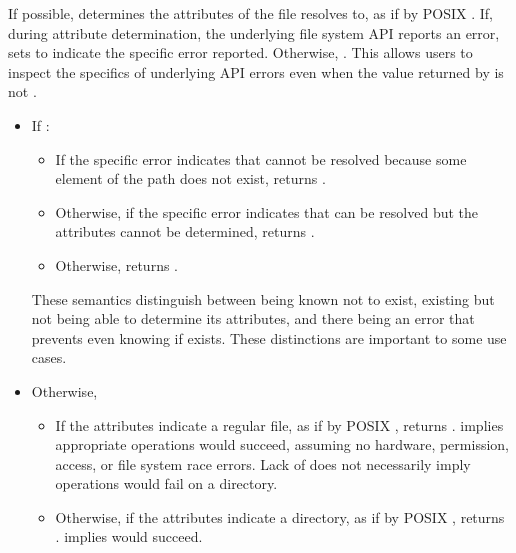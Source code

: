 \begin{itemdescr}
\pnum
\effects
If possible, determines the attributes
    of the file  resolves to, as if by POSIX .
      If, during attribute determination, the underlying file system API reports
    an error, sets  to indicate the specific error reported.
    Otherwise, .
\enternote This allows users to inspect the specifics of underlying
      API errors even when the value returned by  is not
      . \exitnote

\pnum
\returns
\begin{itemize}
\item
If :
\begin{itemize}
\item If the specific error indicates that  cannot be resolved
      because some element of the path does not exist, returns
      .
\item Otherwise, if the specific error indicates that  can be resolved
      but the attributes cannot be determined, returns
      .
\item Otherwise, returns .
\end{itemize}
\enternote These semantics distinguish between  being known not to exist,  existing but not being able to determine its attributes,
        and there being an error that prevents even knowing if  exists. These
        distinctions are important to some use cases. \exitnote
\item
Otherwise,
\begin{itemize}
\item If the attributes indicate a regular file, as if by POSIX ,
      returns . \enternote
       implies appropriate  operations
      would succeed, assuming no hardware, permission, access, or file system
      race errors. Lack of  does not necessarily imply
       operations would fail on a directory.  \exitnote
\item Otherwise, if the attributes indicate a directory, as if by POSIX
      , returns .
      \enternote {} implies
       would succeed.  \exitnote

\end{itemize}
\end{itemize}
\end{itemdescr}
